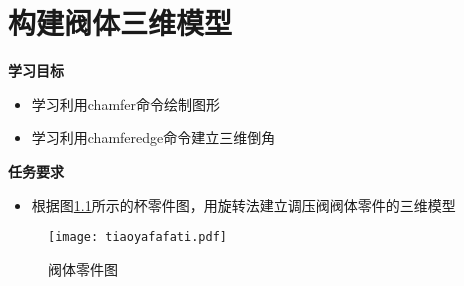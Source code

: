 \chapter{构建阀体三维模型}

{\bfseries 学习目标}
\begin{itemize}
\item 学习利用chamfer命令绘制图形
\item 学习利用chamferedge命令建立三维倒角
\end{itemize}

{\bfseries 任务要求}
\begin{itemize}
\item 根据图\ref{fig:tiaoyafafati}所示的杯零件图，用旋转法建立调压阀阀体零件的三维模型
\end{itemize}

\noindent
\begin{figure}[htbp]
\centering
\texttt{[image: tiaoyafafati.pdf]}
\caption{阀体零件图}\label{fig:tiaoyafafati}
\end{figure}
\endinput